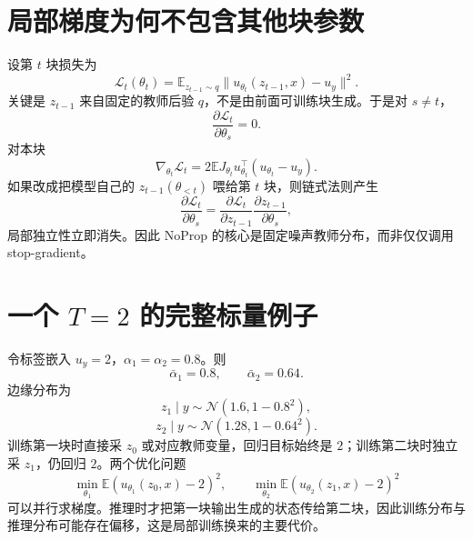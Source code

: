 \documentclass[UTF8,12pt,a4paper,fontset=none]{ctexart}
\numberwithin{equation}{section}
\newcommand{\E}{\mathbb{E}}
\newcommand{\Loss}{\mathcal{L}}
\begin{document}
\section{局部梯度为何不包含其他块参数}
设第 $t$ 块损失为
\begin{equation}
 \Loss_t(\theta_t)=\E_{z_{t-1}\sim q}
 \|u_{\theta_t}(z_{t-1},x)-u_y\|^2.
\end{equation}
关键是 $z_{t-1}$ 来自固定的教师后验 $q$，不是由前面可训练块生成。于是对 $s\ne t$，
\begin{equation}
 \frac{\partial\Loss_t}{\partial\theta_s}=0.
\end{equation}
对本块
\begin{equation}
 \nabla_{\theta_t}\Loss_t
 =2\E J_{\theta_t}u_{\theta_t}^{\top}
 (u_{\theta_t}-u_y).
\end{equation}
如果改成把模型自己的 $z_{t-1}(\theta_{<t})$ 喂给第 $t$ 块，则链式法则产生
\begin{equation}
 \frac{\partial\Loss_t}{\partial\theta_s}
 =\frac{\partial\Loss_t}{\partial z_{t-1}}
 \frac{\partial z_{t-1}}{\partial\theta_s},
\end{equation}
局部独立性立即消失。因此 NoProp 的核心是固定噪声教师分布，而非仅仅调用 stop-gradient。

\section{一个 $T=2$ 的完整标量例子}
令标签嵌入 $u_y=2$，$\alpha_1=\alpha_2=0.8$。则
\begin{equation}
 \bar\alpha_1=0.8,
 \qquad
 \bar\alpha_2=0.64.
\end{equation}
边缘分布为
\begin{equation}
 z_1\mid y\sim\mathcal N(1.6,1-0.8^2),
\end{equation}
\begin{equation}
 z_2\mid y\sim\mathcal N(1.28,1-0.64^2).
\end{equation}
训练第一块时直接采 $z_0$ 或对应教师变量，回归目标始终是 $2$；训练第二块时独立采 $z_1$，仍回归 $2$。两个优化问题
\begin{equation}
 \min_{\theta_1}\E(u_{\theta_1}(z_0,x)-2)^2,
 \qquad
 \min_{\theta_2}\E(u_{\theta_2}(z_1,x)-2)^2
\end{equation}
可以并行求梯度。推理时才把第一块输出生成的状态传给第二块，因此训练分布与推理分布可能存在偏移，这是局部训练换来的主要代价。
\end{document}
